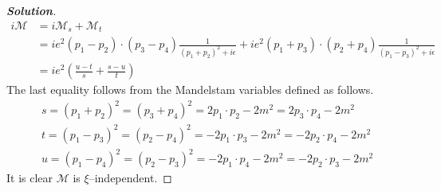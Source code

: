 \documentclass[11pt]{article}
\newenvironment{solution}[1][]{\begin{proof}[\textbf{Solution}]}{\end{proof}}
\begin{document}
\begin{solution}[11.10]
\[\begin{aligned}
				i\mathcal{M}&=i\mathcal{M}_s+\mathcal{M}_{t}\\
				&=ie^2(p_1-p_2)\cdot(p_3-p_4)\frac{1}{(p_1+p_2)^2+i\epsilon}+ie^2(p_1+p_3)\cdot(p_2+p_4)\frac{1}{(p_1-p_3)^2+i\epsilon}\\
				&=\boxed{ie^2\left(\frac{u-t}{s}+\frac{s-u}{t}\right)}
			\end{aligned}
			\]
			The last equality follows from the Mandelstam variables defined as follows.
			\[
			\begin{gathered}
				s=(p_1+p_2)^2=(p_3+p_4)^2=2p_1\cdot p_2-2m^2=2p_3\cdot p_4-2m^2\\
				t=(p_1-p_3)^2=(p_2-p_4)^2=-2p_1\cdot p_3-2m^2=-2p_2\cdot p_4-2m^2\\
				u=(p_1-p_4)^2=(p_2-p_3)^2=-2p_1\cdot p_4-2m^2=-2p_2\cdot p_3-2m^2
			\end{gathered}
			\]
			It is clear $\mathcal{M}$ is $\xi$--independent.
	\end{solution}
	
\end{document}
